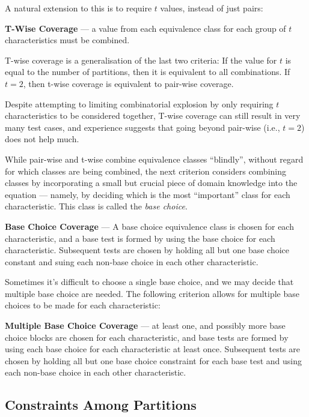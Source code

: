 A natural extension to this is to require $t$ values, instead of just pairs:

{\bf T-Wise Coverage} --- a value from each equivalence class for each group of
$t$ characteristics must be combined.

T-wise coverage is a generalisation of the last two criteria: If the value for
$t$ is equal to the number of partitions, then it is equivalent to all
combinations. If $t=2$, then t-wise coverage is equivalent to pair-wise
coverage.

Despite attempting to limiting combinatorial explosion by only requiring $t$
characteristics to be considered together, T-wise coverage can still result in
very many test cases, and experience suggests that going beyond pair-wise (i.e.,
$t=2$) does not help much.

While pair-wise and t-wise combine equivalence classes ``blindly'', without
regard for which classes are being combined, the next criterion considers
combining classes by incorporating a small but crucial piece of domain knowledge
into the equation --- namely, by deciding which is the most ``important'' class
for each characteristic. This class is called the {\it base choice}.

{\bf Base Choice Coverage} --- A base choice equivalence class is chosen for
each characteristic, and a base test is formed by using the base choice for each
characteristic. Subsequent tests are chosen by holding all but one base choice
constant and suing each non-base choice in each other characteristic.

Sometimes it's difficult to choose a single base choice, and we may decide that
multiple base choice are needed. The following criterion allows for multiple
base choices to be made for each characteristic:

{\bf Multiple Base Choice Coverage} --- at least one, and possibly more base
choice blocks are chosen for each characteristic, and base tests are formed by
using each base choice for each characteristic at least once. Subsequent tests
are chosen by holding all but one base choice constraint for each base test and
using each non-base choice in each other characteristic.


\subsection{Constraints Among Partitions}

